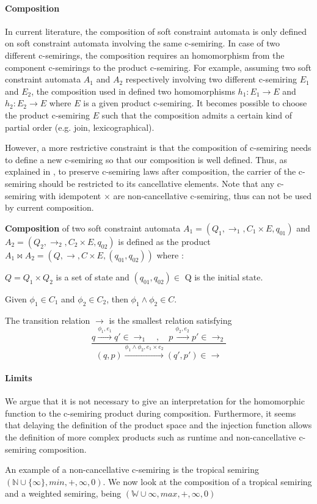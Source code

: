 \paragraph{Composition} 
In current literature, the composition of soft constraint automata is only defined on soft constraint automata involving the same c-semiring. In case of two different c-semirings, the composition requires an homomorphism from the component c-semirings to the product c-semiring. For example, assuming two soft constraint automata $A_1$ and $A_2$ respectively involving two different c-semiring $E_1$ and $E_2$, the composition used in \cite{?} defined two homomorphisms $h_1 : E_1 \rightarrow E$ and $h_2 : E_2 \rightarrow E$ where $E$ is a given product c-semiring. It becomes possible to choose the product c-semiring $E$ such that the composition admits a certain kind of partial order (e.g. join, lexicographical).

However, a more restrictive constraint is that the composition of c-semiring needs to define a new c-semiring so that our composition is well defined. Thus, as explained in \cite{?}, to preserve c-semiring laws after composition, the carrier of the c-semiring should be restricted to its cancellative elements. Note that any c-semiring with idempotent $\times$ are non-cancellative c-semiring, thus can not be used by current composition.


\begin{definition}
	\textbf{Composition} of two soft constraint automata $A_1=(Q_1,\rightarrow_1, C_1 \times E, q_{01})$ and $A_2=(Q_2,\rightarrow_2, C_2\times E, q_{02})$ is defined as the product $ {A_1 \bowtie A_2} = (Q, \rightarrow, C\times E, (q_{01},q_{02}) )$ where : 
	\begin{list}{-}{ }
		\item $Q= Q_1 \times Q_2 $ is a set of state and $(q_{01},q_{02})\in$ Q is the initial state.
		\item Given $\phi_1 \in C_1$ and $\phi_2 \in C_2$, then $\phi_1 \land \phi_2 \in C$.
		\item The transition relation $\rightarrow$ is the smallest relation satisfying
		$$
		\frac{q \xrightarrow{\phi_1,e_1} q' \in \rightarrow _1 \quad , \quad p\xrightarrow{\phi_2,e_2}p' \in \rightarrow_2}{(q,p) \xrightarrow{\phi_1 \land \phi_2,e_1 \times e_2}(q',p') \in \rightarrow}
		$$
	\end{list}
\end{definition}
\paragraph{Limits}
We argue that it is not necessary to give an interpretation for the homomorphic function to the c-semiring product during composition. Furthermore, it seems that delaying the definition of the product space and the injection function allows the definition of more complex products such as runtime and non-cancellative c-semiring composition.

An example of a non-cancellative c-semiring is the tropical semiring  $(\mathbb{N}\cup\{\infty\},min,+,\infty,0)$. We now look at the composition of a tropical semiring and a weighted semiring, being $(\mathbb{W}\cup{\infty},max,+,\infty,0)$